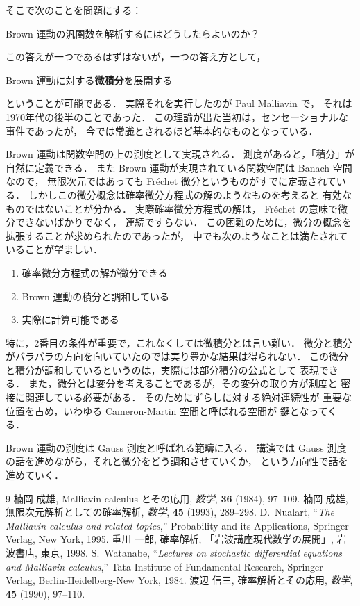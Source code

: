 \documentclass[uplatex,dvipdfmx]{jlreq}
\begin{document}
そこで次のことを問題にする：
\begin{center}
Brown 運動の汎関数を解析するにはどうしたらよいのか？
\end{center}
この答えが一つであるはずはないが，一つの答え方として，
\begin{center}
Brown 運動に対する{\bfseries 微積分}を展開する
\end{center}
ということが可能である．
実際それを実行したのが Paul Malliavin で，
それは1970年代の後半のことであった．
この理論が出た当初は，センセーショナルな事件であったが，
今では常識とされるほど基本的なものとなっている．

Brown 運動は関数空間の上の測度として実現される．
測度があると，「積分」が自然に定義できる．
また Brown 運動が実現されている関数空間は Banach 空間なので，
無限次元ではあっても Fr\'echet 微分というものがすでに定義されている．
しかしこの微分概念は確率微分方程式の解のようなものを考えると
有効なものではないことが分かる．
実際確率微分方程式の解は， Fr\'echet の意味で微分できないばかりでなく，
連続ですらない．
この困難のために，微分の概念を拡張することが求められたのであったが，
中でも次のようなことは満たされていることが望ましい．
\begin{enumerate}
\item 確率微分方程式の解が微分できる
\item Brown 運動の積分と調和している
\item 実際に計算可能である
\end{enumerate}
特に，2番目の条件が重要で，これなくしては微積分とは言い難い．
微分と積分がバラバラの方向を向いていたのでは実り豊かな結果は得られない．
この微分と積分が調和しているというのは，実際には部分積分の公式として
表現できる．
また，微分とは変分を考えることであるが，その変分の取り方が測度と
密接に関連している必要がある．
そのためにずらしに対する絶対連続性が
重要な位置を占め，いわゆる Cameron-Martin 空間と呼ばれる空間が
鍵となってくる．

Brown 運動の測度は Gauss 測度と呼ばれる範疇に入る．
講演では Gauss 測度の話を進めながら，それと微分をどう調和させていくか，
という方向性で話を進めていく．

\begin{thebibliography}{9}
 楠岡 成雄,
Malliavin calculus とその応用,
{\it 数学}, {\bfseries 36} (1984), 97--109.
 楠岡 成雄,
無限次元解析としての確率解析,
{\it 数学}, {\bfseries 45} (1993), 289--298.
 D.~Nualart,
``{\it The Malliavin calculus and related topics\/},''
Probability and its Applications, Springer-Verlag, New York, 1995.
 重川 一郎,
確率解析, 「岩波講座現代数学の展開」, 岩波書店, 東京, 1998.
 S.~Watanabe,
``{\it Lectures on stochastic differential equations and Malliavin
calculus\/},'' Tata Institute of Fundamental Research,
Springer-Verlag, Berlin-Heidelberg-New York, 1984.
 渡辺 信三,
確率解析とその応用,
{\it 数学}, {\bfseries 45} (1990), 97--110.
\end{thebibliography}
\end{document}
